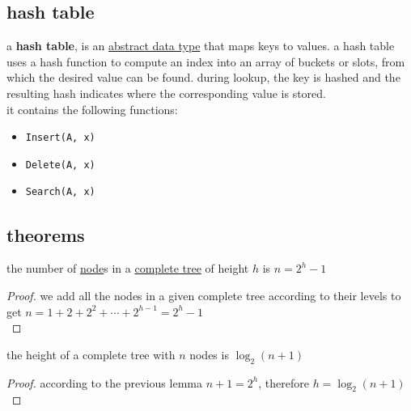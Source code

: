 \documentclass[a4paper,12pt]{article}
\begin{document}
\subsection{hash table}
\label{sec:org4f64d21}
\begin{definition}
a \textbf{hash table}, is an \hyperref[sec:orga3b31cf]{abstract data type} that maps keys to values. a hash table uses a hash function to compute an index into an array of buckets or slots, from which the desired value can be found. during lookup, the key is hashed and the resulting hash indicates where the corresponding value is stored.\\[0pt]
it contains the following functions:\\[0pt]
\begin{itemize}
\item \texttt{Insert(A, x)}\\[0pt]
\item \texttt{Delete(A, x)}\\[0pt]
\item \texttt{Search(A, x)}\\[0pt]
\end{itemize}
\end{definition}
\subsection{theorems}
\label{sec:org97a5c46}
\begin{lemma}
the number of \hyperref[sec:orgec4976f]{node}s in a \hyperref[sec:org8d4eeb6]{complete tree} of height \(h\) is \(n = 2^h-1\)\\[0pt]
\begin{proof}
we add all the nodes in a given complete tree according to their levels to get \(n = 1+2+2^2+\cdots+2^{h-1}=2^h-1\)\\[0pt]
\end{proof}
\end{lemma}

\begin{lemma}
the height of a complete tree with \(n\) nodes is \(\log_2(n+1)\)\\[0pt]
\begin{proof}
according to the previous lemma \(n+1 = 2^h\), therefore \(h = \log_2(n+1)\)\\[0pt]
\end{proof}
\end{lemma}
\end{document}
